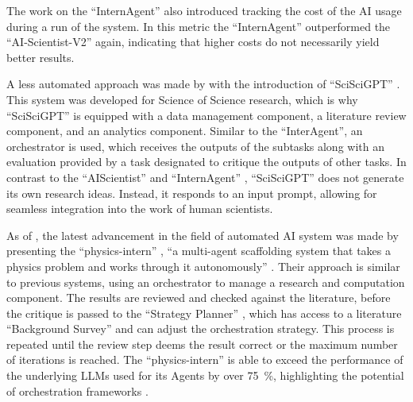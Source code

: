\documentclass[
	fontsize = 11pt,
	paper = a4,
	draft = false,
	twoside = true,
	titlepage = false
]{scrartcl}
\numberwithin{equation}{subsection}
\begin{document}
	The work on the \enquote{InternAgent} \autocite{internAgent} also introduced tracking the cost of the AI usage during a run of the system. In this metric the \enquote{InternAgent} \autocite{internAgent} outperformed the \enquote{AI-Scientist-V2} \autocite{aiSci2} again, indicating that higher costs do not necessarily yield better results.

	A less automated approach was made by \citeauthor{sciSci} with the introduction of \enquote{SciSciGPT} \autocite{sciSci}. This system was developed for Science of Science research, which is why \enquote{SciSciGPT} is equipped with a data management component, a literature review component, and an analytics component. Similar to the \enquote{InterAgent}, an orchestrator is used, which receives the outputs of the subtasks along with an evaluation provided by a task designated to critique the outputs of other tasks. In contrast to the \enquote{AIScientist} \autocite{aiScientist} and \enquote{InternAgent} \autocite{internAgent}, \enquote{SciSciGPT} \autocite{sciSci} does not generate its own research ideas. Instead, it responds to an input prompt, allowing for seamless integration into the work of human scientists. \autocite{sciSci}
	
	As of , the latest advancement in the field of automated \gls{AI} system was made by \citeauthor{pIntern} presenting the \enquote{physics-intern} \autocite{pIntern}, \enquote{a multi-agent scaffolding system that takes a physics problem and works through it autonomously} \autocite[section 3]{pIntern}. Their approach is similar to previous systems, using an orchestrator to manage a research and computation component. The results are reviewed and checked against the literature, before the critique is passed to the \enquote{Strategy Planner} \autocite{pIntern}, which has access to a literature \enquote{Background Survey} \autocite{pIntern} and can adjust the orchestration strategy. This process is repeated until the review step deems the result correct or the maximum number of iterations is reached. The \enquote{physics-intern} \autocite{pIntern} is able to exceed the performance of the underlying \gls{LLM}s used for its \glspl{Agent} by over \si{75 \percent}, highlighting the potential of orchestration frameworks \autocite{pIntern}.
	
\end{document}
